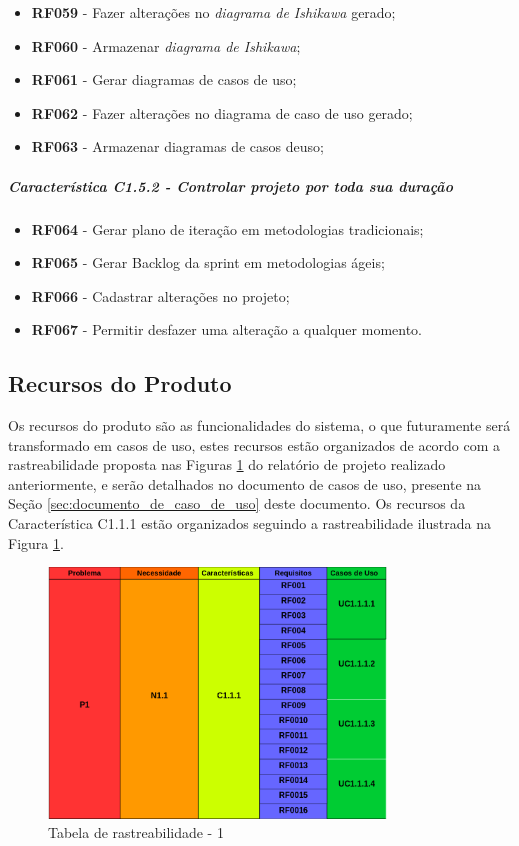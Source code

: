 \begin{enumerate}
\begin{itemize}
				\item \textbf{RF059} - Fazer alterações no \textit{diagrama de Ishikawa} gerado;
				\item \textbf{RF060} - Armazenar \textit{diagrama de Ishikawa};
				\item \textbf{RF061} - Gerar diagramas de casos de uso;
				\item \textbf{RF062} - Fazer alterações no diagrama de caso de uso gerado;
				\item \textbf{RF063} - Armazenar diagramas de casos deuso;
			\end{itemize}
		\subparagraph{Característica C1.5.2 - Controlar projeto por toda sua duração}
			\begin{itemize}
				\item \textbf{RF064} - Gerar plano de iteração em metodologias tradicionais;
				\item \textbf{RF065} - Gerar Backlog da sprint em metodologias ágeis;
				\item \textbf{RF066} - Cadastrar alterações no projeto;
				\item \textbf{RF067} - Permitir desfazer uma alteração a qualquer momento.
			\end{itemize}
	\end{enumerate}

\subsection{Recursos do Produto}
\label{subsub:recursos_produto}

Os recursos do produto são as funcionalidades do sistema, o que futuramente será transformado em casos de uso, estes recursos estão organizados de acordo com a rastreabilidade proposta nas Figuras \ref{img:tabelaParte1} do relatório de projeto realizado anteriormente, e serão detalhados no documento de casos de uso, presente na Seção \ref{sec:documento_de_caso_de_uso} deste documento. Os recursos da Característica C1.1.1 estão organizados seguindo a rastreabilidade ilustrada na Figura \ref{img:tabelaParte1}.

\begin{figure}[H]
	\centering
	\includegraphics[width=0.8\textwidth]{imgModelagem/tabelaParte1}
	\caption{Tabela de rastreabilidade - 1 }
	\label{img:tabelaParte1}
\end{figure}

